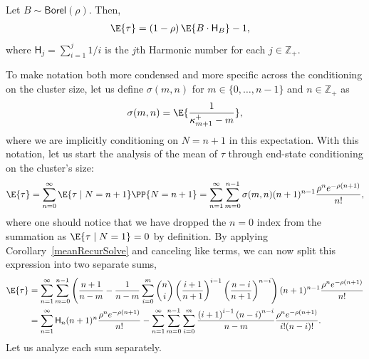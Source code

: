 \begin{theorem}\label{meanIdThm}
Let $B \sim \mathsf{Borel}(\rho)$. Then,
\begin{align}
\E{\tau}
&=
\left(1-\rho\right)
\E{B \cdot \mathsf{H}_B}
-
1
,
\end{align}
where $\mathsf{H}_j = \sum_{i=1}^j 1/i$ is the $j$th Harmonic number for each $j \in \mathbb{Z}_+$.
\end{theorem}
To make notation both more condensed and more specific across the conditioning on the cluster size, let us define $\sigma(m,n)$ for $m \in \{0, \dots, n - 1\}$ and $n \in \mathbb{Z}_+$ as
\begin{align}
\sigma(m,n)
=
\E{\frac{1}{\kappa_{m+1}^+-m}}
,
\end{align}
where we are implicitly conditioning on $N=n+1$ in this expectation. With this notation, let us start the analysis of the mean of $\tau$ through end-state conditioning on the cluster's size:
\begin{align}
\E{\tau}
=
\sum_{n=0}^\infty \E{\tau \mid N = n+1}\PP{N=n+1}
=
\sum_{n=1}^\infty \sum_{m=0}^{n-1} \sigma(m,n)  (n+1)^{n-1} \frac{\rho^n e^{-\rho(n+1)}}{n!} 
,
\end{align}
where one should notice that we have dropped the $n=0$ index from the summation as $\E{\tau \mid N = 1} = 0$ by definition. By applying Corollary~\ref{meanRecurSolve} and canceling like terms, we can now split this expression into two separate sums,
\begin{align}
\E{\tau}
&=
\sum_{n=1}^\infty 
\sum_{m=0}^{n-1}
\left(
\frac{n+1}{n-m}
-
\frac{1}{n-m}
\sum_{i=0}^m
{n \choose i}
\left(\frac{i+1}{n+1}\right)^{i-1}
\left(\frac{n-i}{n+1}\right)^{n-i}
\right)
(n+1)^{n-1} \frac{\rho^n e^{-\rho(n+1)}}{n!}
\\
&=
\sum_{n=1}^\infty 
\mathsf{H}_n (n+1)^{n} \frac{\rho^n e^{-\rho(n+1)}}{n!}
-
\sum_{n=1}^\infty
\sum_{m=0}^{n-1}
\sum_{i=0}^m
\frac{\left({i+1}\right)^{i-1}
\left({n-i}\right)^{n-i}}{n-m}
 \frac{\rho^n e^{-\rho(n+1)}}{i!(n-i)!}
 .
 \label{twoSumEq}
\end{align}
Let us analyze each sum separately. 

